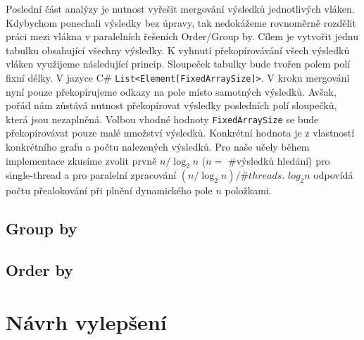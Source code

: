 Poslední část analýzy je nutnost vyřešit mergování výsledků jednotlivých vláken.
Kdybychom ponechali výsledky bez úpravy, tak nedokážeme rovnoměrně rozdělit práci mezi vlákna v paralelních řešeních Order/Group by.
Cílem je vytvořit jednu tabulku obsahující všechny výsledky.
K vyhnutí překopírovávání všech výsledků vláken využijeme následující princip.
Sloupeček tabulky bude tvořen polem polí fixní délky.
V jazyce C\# \texttt{List<Element[FixedArraySize]>}.
V kroku mergování nyní pouze překopírujeme odkazy na pole místo samotných výsledků.
Avšak, pořád nám zůstává nutnost překopírovat výsledky posledních polí sloupečků, která jsou nezaplněná.
Volbou vhodné hodnoty \texttt{FixedArraySize} se bude překopírovávat pouze malé množství výsledků.
Konkrétní hodnota je z vlastností konkrétního grafu a počtu nalezených výsledků.
Pro naše učely během implementace zkusíme zvolit prvně $n/\log_2 n$ ($n = $ \#výsledků hledání) pro single-thread a pro paralelní zpracování $(n/\log_2 n)/\#threads$.
$log_2 n$ odpovídá počtu přealokování při plnění dynamického pole $n$ položkami.    

\subsection{Group by}

\subsection{Order by}



\section{Návrh vylepšení}
\label{anal.improvement}